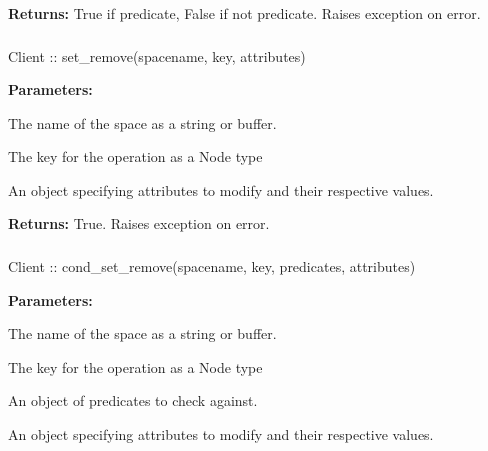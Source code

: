 \noindent\textbf{Returns:}
True if predicate, False if not predicate.  Raises exception on error.

\subsubsection{}
\label{api:nodejs:set_remove}
\begin{javascriptcode}
Client :: set_remove(spacename, key, attributes)
\end{javascriptcode}


\noindent\textbf{Parameters:}
\begin{description}[labelindent=\widthof{{\code{attributes}}},leftmargin=*,noitemsep,nolistsep,align=right]
\item[\code{spacename}] The name of the space as a string or buffer.
\item[\code{key}] The key for the operation as a Node type
\item[\code{attributes}] An object specifying attributes to modify and their respective values.
\end{description}

\noindent\textbf{Returns:}
True.  Raises exception on error.

\subsubsection{}
\label{api:nodejs:cond_set_remove}
\begin{javascriptcode}
Client :: cond_set_remove(spacename, key, predicates, attributes)
\end{javascriptcode}


\noindent\textbf{Parameters:}
\begin{description}[labelindent=\widthof{{\code{predicates}}},leftmargin=*,noitemsep,nolistsep,align=right]
\item[\code{spacename}] The name of the space as a string or buffer.
\item[\code{key}] The key for the operation as a Node type
\item[\code{predicates}] An object of predicates to check against.
\item[\code{attributes}] An object specifying attributes to modify and their respective values.
\end{description}


